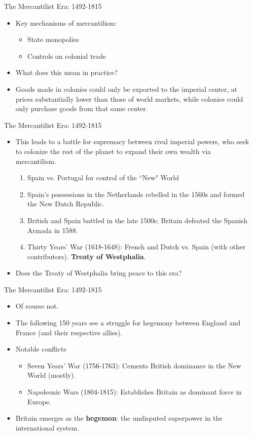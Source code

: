\documentclass[handout]{beamer}
\begin{document}
\begin{frame}{\LARGE The Mercantilist Era: 1492-1815}
	\begin{itemize}
		\item Key mechanisms of mercantilism:
			\begin{itemize}
				\item State monopolies	
				\item Controls on colonial trade
		\end{itemize}	
		\item What does this mean in practice? \pause
		\item Goods made in colonies could only be exported to the imperial center, at prices substantially lower than those of world markets, while colonies could only purchase goods from that same center.
	\end{itemize}
\end{frame}

\begin{frame}{\LARGE The Mercantilist Era: 1492-1815}
	\begin{itemize}
		\item This leads to a battle for supremacy between rival imperial powers, who seek to colonize the rest of the planet to expand their own wealth via mercantilism.
		\begin{enumerate}
			\item Spain vs. Portugal for control of the ``New" World
			\item Spain’s possessions in the Netherlands rebelled in the 1560s and formed the New Dutch Republic.
			\item British and Spain battled in the late 1500s; Britain defeated the Spanish Armada in 1588.
			\item Thirty Years' War (1618-1648): French and Dutch vs. Spain (with other contributors). \textbf{Treaty of Westphalia}. \pause
		\end{enumerate}
		\item Does the Treaty of Westphalia bring peace to this era?
	\end{itemize}
\end{frame}

\begin{frame}{\LARGE The Mercantilist Era: 1492-1815}
	\begin{itemize}
		\item Of course not. \pause
		\item The following 150 years see a struggle for hegemony between England and France (and their respective allies).
		\item Notable conflicts
			\begin{itemize}
				\item Seven Years’ War (1756-1763): Cements British dominance in the New World (mostly).
				\item Napoleonic Wars (1804-1815): Establishes Britain as dominant force in Europe.				
			\end{itemize}
		\item Britain emerges as the \textbf{hegemon}: the undisputed superpower in the international system.
	\end{itemize}
\end{frame}
\end{document}
